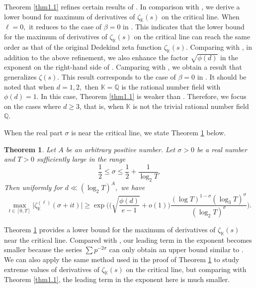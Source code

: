 \documentclass[12pt,reqno]{amsart}
\newtheorem{thm}{Theorem}[section]
\theoremstyle{definition}
\numberwithin{equation}{section}
\newcommand{\mbk}{\mathbb{K}}
\newcommand{\mbq}{\mathbb{Q}}
\begin{document}
Theorem \ref{thm1.1} refines certain results of \cite{bondarenko2023dichotomy,yang2022extreme}. In comparison with \cite{bondarenko2023dichotomy}, we derive a lower bound for maximum of derivatives of $\zeta_\mbk(s)$ on the critical line. When $\ell = 0,$ it reduces to the case of $\beta = 0$ in \cite[Theorem 1]{bondarenko2023dichotomy}. This indicates that the lower bound for the maximum of derivatives of $\zeta_\mbk(s)$ on the critical line can reach the same order as that of the original Dedekind zeta function $\zeta_\mbk(s)$. Comparing with \cite{bondarenko2023dichotomy}, in addition to the above refinement, we also enhance the factor $\sqrt{\phi(d)}$ in the exponent on the right-hand side of \cite[Eq. (2)]{bondarenko2023dichotomy}. Camparing with \cite{yang2022extreme}, we obtain a result that generalizes $\zeta(s)$. This result corresponds to the case of $\beta = 0$ in \cite[Theorem 2.(A)]{yang2022extreme}. It should be noted that when $d = 1,2,$ then $\mbk=\mbq$ is the rational number field with $\phi(d)=1$. In this case, Theorem \ref{thm1.1} is weaker than \cite[Theorem 2]{yang2022extreme}. Therefore, we focus on the cases where $d\ge 3$, that is, when $\mbk$ is not the trivial rational number field $\mbq$. 
\par
When the real part $\sigma$ is near the critical line, we state Theorem \ref{thm1.2} below.
\begin{thm}
    \label{thm1.2}
    Let $A$ be an arbitrary positive number. Let $\sigma > 0$ be a real number and $T>0$ sufficiently large in the range 
    $$\frac{1}{2} \le \sigma \le \frac{1}{2} + \frac{1}{\log_2 T}.$$
    Then uniformly for $d \ll (\log_2 T)^A,$ we have
    $$
    \max_{t\in[0,T]}\Big|\zeta_{\mbk}^{(\ell)}(\sigma+it)\Big|\ge \exp\bigg(\Big(\sqrt{\frac{\phi(d)}{e-1}}+o(1)\Big)\frac{(\log T)^{1-\sigma}(\log_3 T)^{\sigma}}{(\log_2 T)^{\sigma}}\bigg).
    $$
\end{thm}
\par
Theorem \ref{thm1.2} provides a lower bound for the maximum of derivatives of $\zeta_\mbk(s)$ near the critical line. Compared with \cite[Theorem 1]{bondarenko2023dichotomy}, our leading term in the exponent becomes smaller because the series $\sum p^{-2\sigma}$ can only obtain an upper bound similar to \cite[Lemma 9]{chirre2019extreme}. We can also apply the same method used in the proof of Theorem \ref{thm1.2} to study extreme values of derivatives of $\zeta_\mbk(s)$ on the critical line, but comparing with Theorem \ref{thm1.1}, the leading term in the exponent here is much smaller.
\par
\end{document}

